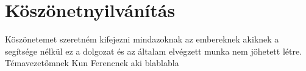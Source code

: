 \chapter{Köszönetnyilvánítás}

Köszönetemet szeretném kifejezni mindazoknak az embereknek akiknek a segítsége nélkül ez a dolgozat és az általam elvégzett munka nem jöhetett létre. Témavezetőmnek Kun Ferencnek aki blablabla
